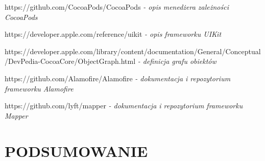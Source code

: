\documentclass[12pt,oneside,a4paper]{report}
\begin{document}
\begin{thebibliography}{50}
 https://github.com/CocoaPods/CocoaPods
\emph{ - opis menedżera zależności CocoaPods}

https://developer.apple.com/reference/uikit
\emph{ - opis frameworku UIKit}

 https://developer.apple.com/library/content/documentation/General/Conceptual/DevPedia-CocoaCore/ObjectGraph.html
\emph{ - definicja grafu obiektów}

https://github.com/Alamofire/Alamofire
\emph{ - dokumentacja i repozytorium frameworku Alamofire}

https://github.com/lyft/mapper
\emph{ - dokumentacja i repozytorium frameworku Mapper}
\end{thebibliography}
\chapter{PODSUMOWANIE}
\end{document}
